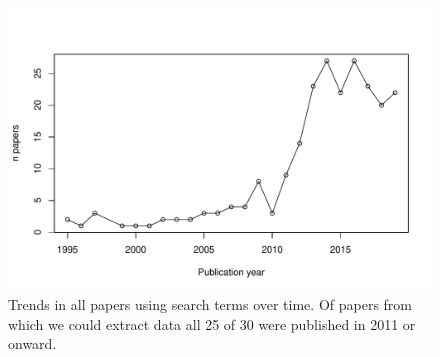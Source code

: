 \documentclass[11pt,letter]{article}
\begin{document}
\begin{figure}[t!]
\centering
\includegraphics[width=1\textwidth]{..//..//R/graphs/otherdat/papersovertime.pdf}
\caption{Trends in all papers using search terms over time. Of papers from which we could extract data all 25 of 30 were published in 2011 or onward.}
  \label{fig:papertrends}
\end{figure}
 
\end{document}
